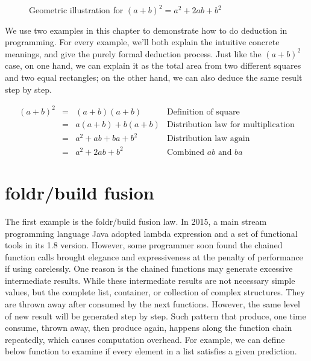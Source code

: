 \documentclass[b5paper]{article}
\begin{document}
\begin{figure}[htbp]
\centering
{}
\caption{Geometric illustration for $(a + b)^2 = a^2 + 2ab + b^2$}
\end{figure}

We use two examples in this chapter to demonstrate how to do deduction in programming. For every example, we'll both explain the intuitive concrete meanings, and give the purely formal deduction process. Just like the $(a+b)^2$ case, on one hand, we can explain it as the total area from two different squares and two equal rectangles; on the other hand, we can also deduce the same result step by step.

\[
\begin{array}{rcll}
(a + b)^2 & = & (a + b)(a + b) & \text{Definition of square} \\
          & = & a(a + b) + b(a + b) & \text{Distribution law for multiplication} \\
          & = & a^2 + ab + ba + b^2 & \text{Distribution law again} \\
          & = & a^2 + 2ab + b^2 & \text{Combined $ab$ and $ba$}
\end{array}
\]

\section{foldr/build fusion}

The first example is the foldr/build fusion law. In 2015, a main stream programming language Java adopted lambda expression and a set of functional tools in its 1.8 version. However, some programmer soon found the chained function calls brought elegance and expressiveness at the penalty of performance if using carelessly. One reason is the chained functions may generate excessive intermediate results. While these intermediate results are not necessary simple values, but the complete list, container, or collection of complex structures. They are thrown away after consumed by the next functions. However, the same level of new result will be generated step by step. Such pattern that produce, one time consume, thrown away, then produce again, happens along the function chain repeatedly, which causes computation overhead. For example, we can define below function to examine if every element in a list satisfies a given prediction\cite{GLPJ-1993}.
\end{document}
